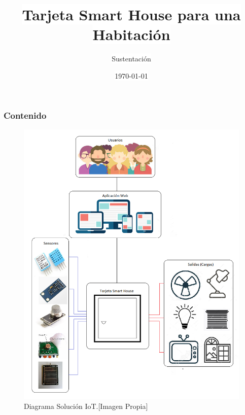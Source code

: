 \documentclass[aspectratio=169]{beamer}
\title{\colorbox{white}{Tarjeta Smart House para una Habitación}}
\subtitle{\colorbox{white}{Sustentación}}
\author{\colorbox{white}{John Alejandro Barahona Pineda \and César Andres Tejada Torres}
\colorbox{white}{Director: César Augusto Álvarez Gaspar}}
\institute{\colorbox{white}{Universidad del Quindío}\\
\colorbox{white}{Armenia, Quindío}}
\date{\colorbox{white}{\today}}
\begin{document}
	\frame{\titlepage}

	
	\begin{frame}
		\begin{multicols}{2}
			\frametitle{Contenido}
				\tableofcontents[hideallsubsections]
		\end{multicols}
	\end{frame}


	 	
 
 	\begin{frame}
		
 	\end{frame}
 	
 	

 	\begin{frame}
		\begin{figure}
			\centering
			\caption{Diagrama Solución IoT.[Imagen Propia]}
			\label{fig:diag}
			\includegraphics[width=0.4\linewidth]{Imagenes/Diagramas}
		\end{figure} 	
	\end{frame}
 	
\end{document}

